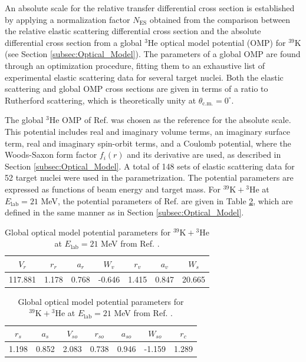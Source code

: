 An absolute scale for the relative transfer differential cross section is established by applying a normalization factor $N_{\mathrm{ES}}$ obtained from the comparison between the relative elastic scattering differential cross section and the absolute differential cross section from a global $^{3}$He optical model potential (OMP) for $^{39}$K (see Section \ref{subsec:Optical_Model}). The parameters of a global OMP are found through an optimization procedure, fitting them to an exhaustive list of experimental elastic scattering data for several target nuclei. Both the elastic scattering and global OMP cross sections are given in terms of a ratio to Rutherford scattering, which is theoretically unity at $\theta_{\mathrm{c.m.}} = 0^{\circ}$.

The global $^{3}$He OMP of Ref. \cite{Liang2009} was chosen as the reference for the absolute scale. This potential includes real and imaginary volume terms, an imaginary surface term, real and imaginary spin-orbit terms, and a Coulomb potential, where the Woods-Saxon form factor $f_{i}(r)$ and its derivative are used, as described in Section \ref{subsec:Optical_Model}. A total of 148 sets of elastic scattering data for 52 target nuclei were used in the parametrization. The potential parameters are expressed as functions of beam energy and target mass. For $^{39}\mathrm{K} + {}^{3}\mathrm{He}$ at $E_{\mathrm{lab}} = 21$ MeV, the potential parameters of Ref. \cite{Liang2009} are given in Table \ref{tab:OMP_3He}, which are defined in the same manner as in Section \ref{subsec:Optical_Model}.

\begin{table}[t]
\centering
\caption{\label{tab:OMP_3He}Global optical model potential parameters for $^{39}\mathrm{K} + {}^{3}\mathrm{He}$ at $E_{\mathrm{lab}} = 21$ MeV from Ref. \cite{Liang2009}.}
\begin{tabular}{ccccccc}
\hline\midrule
$V_{r}$ & $r_{r}$ & $a_{r}$ & $W_{v}$ & $r_{v}$ & $a_{v}$ & $W_{s}$\\ \midrule
117.881 & 1.178 & 0.768 & -0.646 & 1.415 & 0.847 & 20.665\\
\hline\hline
\end{tabular}
\begin{tabular}{ccccccc}
$r_{s}$ & $a_{s}$ & $V_{so}$ & $r_{so}$ & $a_{so}$ & $W_{so}$ & $r_{c}$\\ \midrule
1.198 & 0.852 & 2.083 & 0.738 & 0.946 & -1.159 & 1.289\\
\hline\hline
\end{tabular}
\end{table}

